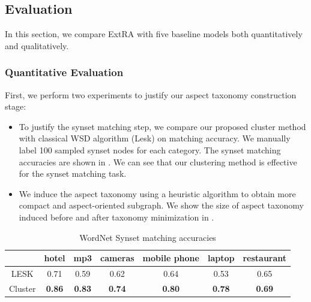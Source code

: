 \subsection{Evaluation}
\label{sec:endeval}
In this section, we compare ExtRA with five baseline models 
both quantitatively and qualitatively.


\subsubsection{Quantitative Evaluation}
\label{sec:quaneval}
First, we perform two experiments to justify our aspect taxonomy construction stage:
\begin{itemize}
	\item 
	To justify the synset matching step,
	we compare our proposed cluster method with classical WSD algorithm (Lesk) on matching accuracy.
	We manually label 100 sampled synset nodes for each category.
	The synset matching accuracies are shown in 
	.
	We can see that our clustering method is effective 
	for the synset matching task.
	\item 
	We induce the aspect taxonomy using a heuristic algorithm to obtain
	more compact and aspect-oriented subgraph. 
	We show the size of aspect taxonomy induced before and after 
taxonomy minimization in .
\end{itemize}

\begin{table}[th]
	\small
	\centering
	\vspace{-0.3cm}
	\caption{WordNet Synset matching accuracies}
	\label{synsetmatching}
	\begin{tabular}{|c|c|c|c|c|c|c|}
		\hline
		& hotel & mp3  & cameras & mobile phone & laptop & restaurant \\ \hline \hline
		LESK    & 0.71  & 0.59 & 0.62    & 0.64                                                   & 0.53   & 0.65       \\ \hline
		Cluster & \textbf{0.86}  & \textbf{0.83} & \textbf{0.74}    & \textbf{0.80}                                                   & \textbf{0.78}   & \textbf{0.69}       \\ \hline
	\end{tabular}
	\vspace{-0.2cm}
\end{table}


